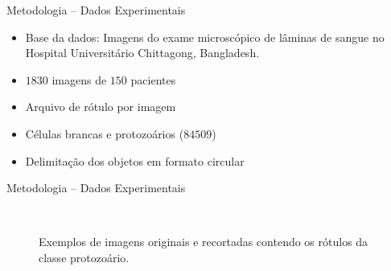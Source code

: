 \begin{frame}{Metodologia -- Dados Experimentais}
\begin{itemize}
    \item \alert{Base da dados}: Imagens do exame microscópico de lâminas de sangue no Hospital Universitário  Chittagong, Bangladesh.
    \ \ \newline
    \item $1830$ imagens de $150$ pacientes
    \item Arquivo de rótulo por imagem
    \item Células brancas e protozoários ($84509$)
    \item Delimitação dos objetos em formato circular
\end{itemize}
\end{frame}

\begin{frame}{Metodologia -- Dados Experimentais}
\begin{figure}[H]
    \centering
	\hfill {} \hfill {}\\
	\caption{Exemplos de imagens originais e recortadas contendo os rótulos da classe protozoário.} \label{img:dataset-samples}
\end{figure}
\end{frame}


